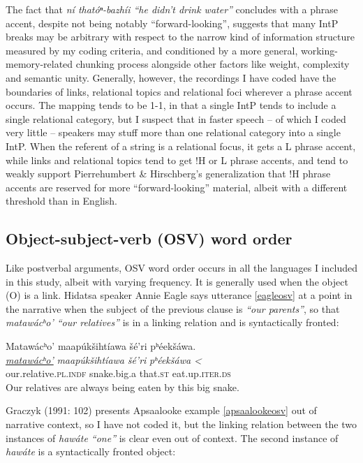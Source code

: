 \documentclass[output=paper]{LSP/langsci}
\begin{document}
The fact that \emph{ní thatóⁿ-bazhíi “he didn’t drink water”} concludes with a phrase accent, despite not being notably “forward-looking”, suggests that many IntP breaks may be arbitrary with respect to the narrow kind of information structure measured by my coding criteria, and conditioned by a more general, working-memory-related chunking process alongside other factors like weight, complexity and semantic unity. Generally, however, the recordings I have coded have the boundaries of links, relational topics and relational foci wherever a phrase accent occurs. The mapping tends to be 1-1, in that a single IntP tends to include a single relational category, but I suspect that in faster speech -- of which I coded very little -- speakers may stuff more than one relational category into a single IntP. When the referent of a string is a relational focus, it gets a L phrase accent, while links and relational topics tend to get !H or L phrase accents, and tend to weakly support Pierrehumbert \& Hirschberg’s  generalization that !H phrase accents are reserved for more “forward-looking” material, albeit with a different threshold than in English.

\subsection{Object-subject-verb (OSV) word order}\label{osv}

Like postverbal arguments, OSV word order occurs in all the languages I included in this study, albeit with varying frequency. It is generally used when the object (O) is a link. Hidatsa speaker Annie Eagle says utterance \ref{eagleosv} at a point in the narrative when the subject of the previous clause is ‎\emph{“our parents”}, so that \emph{matawácʰo’ “our relatives”} is in a linking relation and is syntactically fronted:

\ea\label{eagleosv}
Matawácʰo’ maapúkšihtíawa šé’ri pʰéekšáwa.\footnotemark\\
\gll	\emph{\underline{matawácʰo’}}		\emph{maapúkšihtíawa} 	\emph{šé’ri} 	\emph{pʰéekšáwa <}\\
	our.relative.\textsc{pl.indf} 		snake.big.a 			that.\textsc{st} 	eat.up.\textsc{iter.ds}\\
\glt	Our relatives are always being eaten by this big snake.
\z

Graczyk (1991: 102) presents Apsaalooke example \ref{apsaalookeosv} out of narrative context, so I have not coded it, but the linking relation between the two instances of \emph{hawáte “one”} is clear even out of context. The second instance of \emph{hawáte} is a syntactically fronted object:
\end{document}
